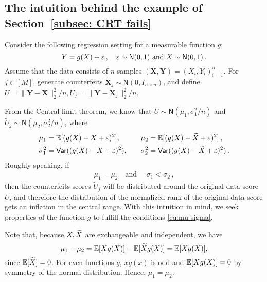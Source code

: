 \documentclass[11pt]{article}
\def\bX{\mathbf{X}}
\def\bY{\mathbf{Y}}
\def\normal{\mathsf{N}}
\def\tbX{\widetilde{\bX}}
\begin{document}
\subsection{The intuition behind the example of Section~\ref{subsec: CRT fails}}\label{poof: example}
Consider the following regression setting for a measurable function $g$:
\[
Y=g(X) +\eps\,, \quad \eps\sim \normal (0,1)  \text{ and } X \sim \normal(0,1)\,.
\]
Assume that the data consists of $n$ samples $(\bX,\bY)=(X_i,Y_i)_{i=1}^{n}$. For $j\in[M]$, generate counterfeits $\tbX_j\sim \normal({0},I_{n\times n})$, and define 
 $U=\|\bY-\bX\|_2^2/n, \widetilde{U}_j=\|\bY-\widetilde{\bX}_j\|_2^2/n$.

From the Central limit theorem, we know that $U\sim \normal(\mu_1, \sigma_1^2/n)$ and $\widetilde{U}_j\sim \normal(\mu_2, \sigma_2^2/n)$, where
\begin{align*}
&\mu_1={\mathbb E}[ (g(X)-X+{\varepsilon})^2 ], \quad\;\;\quad\; \mu_2={\mathbb E}[ (g(X)-{\widetilde{X}}+{\varepsilon})^2 ]\,,\\
&\sigma_1^2=\mathsf{Var}((g(X)-X+{\varepsilon})^2 ) , \quad\;\;\; \sigma_2^2= \mathsf{Var}((g(X)-{\widetilde{X}}+{\varepsilon})^2 )  \,.
\end{align*}  
Roughly speaking, if 
\begin{align}\label{eq:mu-sigma}
\mu_1=\mu_2 \quad \text{and } \quad \sigma_1<\sigma_2\,,
\end{align} 
then the counterfeits scores $\widetilde{U}_j$ will be distributed around the  original data score $U$, and therefore the distribution of the normalized rank of the original data score gets an inflation in the central range.
 With this intuition in mind, we seek properties of the function $g$ to fulfill the conditions \ref{eq:mu-sigma}.
   
Note that, because $X,{\widetilde{X}}$ are exchangeable and independent, we have \[\mu_1-\mu_2={\mathbb E}[Xg(X)]-{\mathbb E}[{\widetilde{X}} g(X)]={\mathbb E}[Xg(X)],\]
since ${\mathbb E}[{\widetilde{X}}]=0$. For even functions $g$, $xg(x)$ is odd and ${\mathbb E}[Xg(X)]=0$ by symmetry of the normal distribution. Hence, $\mu_1=\mu_2$. 
\end{document}
